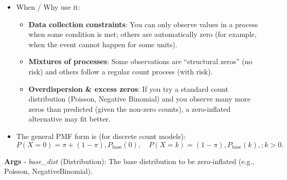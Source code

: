 \documentclass[
  letterpaper,
  DIV=11,
  numbers=noendperiod]{scrartcl}
\providecommand{\tightlist}{%
  \setlength{\itemsep}{0pt}\setlength{\parskip}{0pt}}\usepackage{longtable,booktabs,array}
\begin{document}
\begin{itemize}
\tightlist
\item
  When / Why use it:

  \begin{itemize}
  \tightlist
  \item
    \textbf{Data collection constraints}: You can only observe values in
    a process when some condition is met; others are automatically zero
    (for example, when the event cannot happen for some units).
  \item
    \textbf{Mixtures of processes}: Some observations are ``structural
    zeros'' (no risk) and others follow a regular count process (with
    risk).
  \item
    \textbf{Overdispersion \& excess zeros}: If you try a standard count
    distribution (Poisson, Negative Binomial) and you observe many more
    zeros than predicted (given the non-zero counts), a zero-inflated
    alternative may fit better.
  \end{itemize}
\item
  The general PMF form is (for discrete count models): \[
    P(X=0) = \pi + (1 - \pi),P_{\text{base}}(0),
    \quad
    P(X=k) = (1 - \pi),P_{\text{base}}(k), ; k > 0.
    \]
\end{itemize}

\textbf{Args} - \emph{base\_dist} (Distribution): The base distribution
to be zero-inflated (e.g., Poisson, NegativeBinomial).
\end{document}
